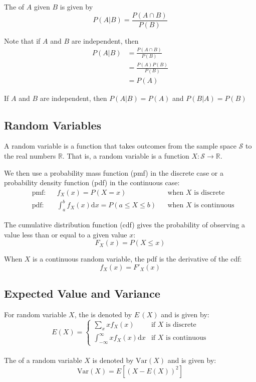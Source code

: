\documentclass[11pt]{article}
\begin{document}
The  of $A$ given $B$ is given by \[P(A|B) = \frac{P(A \cap B)}{P(B)}\]

\begin{lemma}
    Note that if $A$ and $B$ are independent, then \begin{align*}
        P(A|B) & = \frac{P(A \cap B)}{P(B)} \\
               & = \frac{P(A)P(B)}{P(B)}    \\
               & = P(A)
    \end{align*}
\end{lemma}

\begin{corollary}
    If $A$ and $B$ are independent, then $P(A|B) = P(A)$ and $P(B|A) = P(B)$
\end{corollary}

\subsection{Random Variables}

\begin{definition}
    A random variable is a function that takes outcomes from the sample space $\mathcal{S}$ to the real numbers $\mathbb{R}$. That is, a random variable is a function $X: \mathcal{S} \to \mathbb{R}$.
\end{definition}

We then use a probability mass function (pmf) in the discrete case or a
probability density function (pdf) in the continuous case:
\begin{align*}
     & \text{pmf:} &  & f_X(x) = P(X = x)                                   &  & \text{when } X \text{ is discrete}   \\
     & \text{pdf:} &  & \int_{a}^{b}f_X(x) \mathrm{d}x = P(a \leq X \leq b) &  & \text{when } X \text{ is continuous}
\end{align*}

The cumulative distribution function (cdf) gives the probability of observing a
value less than or equal to a given value $x$: \[F_X(x) = P(X \leq x)\]

When $X$ is a continuous random variable, the pdf is the derivative of the cdf: \[f_X(x) = F'_X(x)\]

\subsection{Expected Value and Variance}
For random variable $X$, the  is denoted by $E \,(X)$ and
is given by:
\[
    E(X) = \begin{cases}
        \sum_{x} x f_X(x)                            & \text{if } X \text{ is discrete}   \\
        \int_{-\infty}^{\infty} x f_X(x) \mathrm{d}x & \text{if } X \text{ is continuous}
    \end{cases}
\]
\\
The  of a random variable $X$ is denoted by $\text{Var}(X)$ and is
given by:
\[
    \text{Var}(X) = E\left[(X - E(X))^{2}\right]
\]
\end{document}
